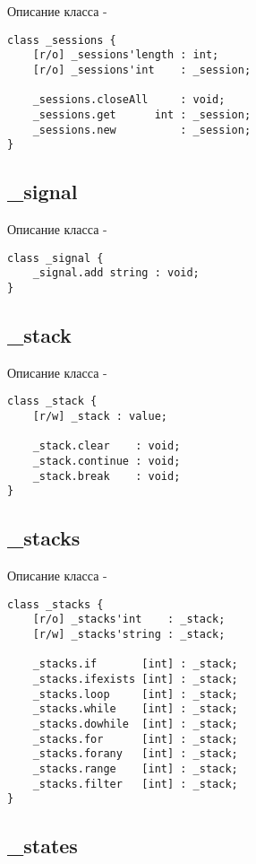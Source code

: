 \noindent Описание класса  -
\begin{lstlisting}[numbers=none]
class _sessions {
	[r/o] _sessions'length : int;
	[r/o] _sessions'int    : _session;
	
	_sessions.closeAll     : void;
	_sessions.get      int : _session;
	_sessions.new          : _session;
}
\end{lstlisting}

\subsection{{\color{orange} \_signal}}

\noindent Описание класса  -
\begin{lstlisting}[numbers=none]
class _signal {
	_signal.add string : void;
}
\end{lstlisting}

\subsection{{\color{orange} \_stack}}

\noindent Описание класса  -
\begin{lstlisting}[numbers=none]
class _stack {
	[r/w] _stack : value;
	
	_stack.clear    : void;
	_stack.continue : void;
	_stack.break    : void;
}
\end{lstlisting}

\subsection{{\color{orange} \_stacks}}

\noindent Описание класса  -
\begin{lstlisting}[numbers=none]
class _stacks {
	[r/o] _stacks'int    : _stack;
	[r/w] _stacks'string : _stack;
	
	_stacks.if       [int] : _stack;
	_stacks.ifexists [int] : _stack;
	_stacks.loop     [int] : _stack;
	_stacks.while    [int] : _stack;
	_stacks.dowhile  [int] : _stack;
	_stacks.for      [int] : _stack;
	_stacks.forany   [int] : _stack;
	_stacks.range    [int] : _stack;
	_stacks.filter   [int] : _stack;
}
\end{lstlisting}

\subsection{{\color{orange} \_states}}

